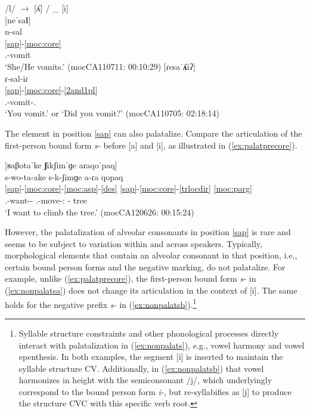\documentclass[output=paper]{langscibook}
\begin{document}
\ea\label{ex:palatizationl}
    /l/ $\rightarrow$ [ʎ] / \_ [i] \\
    \ea{} [neˈsa\textbf{l}] \\
    \glll    n-sal  \\
    \ref{sap}-\ref{moc:core}\\
      {\Third.\I}-vomit\\
\glt `She/He vomits.'  \hfill (mocCA110711: 00:10:29)
\ex{}  [ɾesaˈ\textbf{ʎ}iʔ] \\
    \glll  ɾ-sal-iɾ  \\
    \ref{sap}-\ref{moc:core}-\ref{2and1pl}\\
      {\Second\Sg.\I}-vomit-{\Second\Sg.\I}\\
\glt `You vomit.' or `Did you vomit?' \hfill (mocCA110705: 02:18:14)      
\z
\z

The element in position \ref{sap} can also palatalize. Compare the articulation of the first-person bound form \textit{s-} before [a] and [i], as illustrated in (\ref{ex:palatprecore}). 

\ea\label{ex:palatprecore} 
    [\textbf{s}aβotaˈke \textbf{ʃ}ikʃimˈɡe aɾaqoˈpaq] \\
    \glll s-wo-ta-ake s-k-ʃimɡe a-ɾa qopaq\\
    \ref{sap}-\ref{moc:core}-\ref{moc:asp}-\ref{des} \ref{sap}-\ref{moc:core}-\ref{trlocdir} \ref{moc:parg}\\
    {\First.\II}-want-{\Dur}-{\Des} {\First.\II}-move-{\Dir:\Up} {\F}-{\DetFour} tree\\
    \glt `I want to climb the tree.' \hfill(mocCA120626: 00:15:24)
\z

However, the palatalization of alveolar consonants in position \ref{sap} is rare and seems to be subject to variation within and across speakers. Typically, morphological elements that contain an alveolar consonant in that position, i.e., certain bound person forms and the negative marking, do not palatalize.  For example, unlike (\ref{ex:palatprecore}), the first-person bound form \textit{s-} in (\ref{ex:nonpalatsa}) does not change its articulation in the context of [i]. The same holds for the negative prefix \textit{s-} in (\ref{ex:nonpalatsb}).\footnote{ Syllable structure constraints and other phonological processes directly interact with palatalization in (\ref{ex:nonpalats}), e.g., vowel harmony and vowel epenthesis. In both examples, the segment [i] is inserted to maintain the syllable structure CV. Additionally, in (\ref{ex:nonpalatsb}) that vowel harmonizes in height with the semiconsonant /j/, which underlyingly correspond to the bound person form \textit{i-}, but re-syllabifies as [j] to produce the structure CVC with this specific verb root.}     
\end{document}
